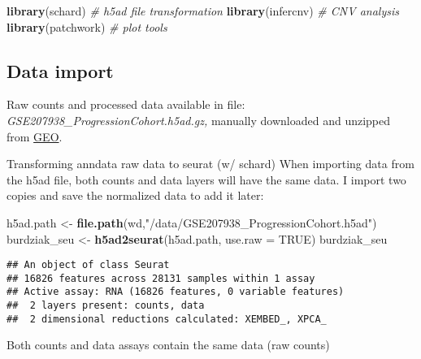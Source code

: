 \documentclass[
]{article}
\newenvironment{Shaded}{\begin{snugshade}}{\end{snugshade}}
\newcommand{\AttributeTok}[1]{\textcolor[rgb]{0.13,0.29,0.53}{#1}}
\newcommand{\CommentTok}[1]{\textcolor[rgb]{0.56,0.35,0.01}{\textit{#1}}}
\newcommand{\ConstantTok}[1]{\textcolor[rgb]{0.56,0.35,0.01}{#1}}
\newcommand{\FunctionTok}[1]{\textcolor[rgb]{0.13,0.29,0.53}{\textbf{#1}}}
\newcommand{\NormalTok}[1]{#1}
\newcommand{\OtherTok}[1]{\textcolor[rgb]{0.56,0.35,0.01}{#1}}
\newcommand{\SpecialCharTok}[1]{\textcolor[rgb]{0.81,0.36,0.00}{\textbf{#1}}}
\newcommand{\StringTok}[1]{\textcolor[rgb]{0.31,0.60,0.02}{#1}}
\begin{document}
\begin{Shaded}
\begin{Highlighting}[]
\FunctionTok{library}\NormalTok{(schard)    }\CommentTok{\# h5ad file transformation}
\FunctionTok{library}\NormalTok{(infercnv)  }\CommentTok{\# CNV analysis}
\FunctionTok{library}\NormalTok{(patchwork) }\CommentTok{\# plot tools}
\end{Highlighting}
\end{Shaded}

\subsection{Data import}\label{data-import}

Raw counts and processed data available in file:
\emph{GSE207938\_ProgressionCohort.h5ad.gz,} manually downloaded and
unzipped from
\href{https://www.ncbi.nlm.nih.gov/geo/download/?acc=GSE207938&format=file&file=GSE207938\%5FProgressionCohort\%2Eh5ad\%2Egz}{GEO}.

Transforming anndata raw data to seurat (w/ schard) When importing data
from the h5ad file, both counts and data layers will have the same data.
I import two copies and save the normalized data to add it later:

\begin{Shaded}
\begin{Highlighting}[]
\NormalTok{h5ad.path }\OtherTok{\textless{}{-}} \FunctionTok{file.path}\NormalTok{(wd,}\StringTok{"/data/GSE207938\_ProgressionCohort.h5ad"}\NormalTok{)}
\NormalTok{burdziak\_seu }\OtherTok{\textless{}{-}} \FunctionTok{h5ad2seurat}\NormalTok{(h5ad.path, }\AttributeTok{use.raw =} \ConstantTok{TRUE}\NormalTok{)   }
\NormalTok{burdziak\_seu}
\end{Highlighting}
\end{Shaded}

\begin{verbatim}
## An object of class Seurat 
## 16826 features across 28131 samples within 1 assay 
## Active assay: RNA (16826 features, 0 variable features)
##  2 layers present: counts, data
##  2 dimensional reductions calculated: XEMBED_, XPCA_
\end{verbatim}

Both counts and data assays contain the same data (raw counts)

\begin{Shaded}
\end{Shaded}
\end{document}
